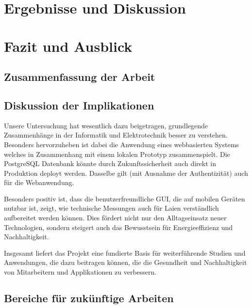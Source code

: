 \section{Ergebnisse und Diskussion}
\label{sec:ergebnisse_und_diskussion}



\section{Fazit und Ausblick}
\label{sec:fazit_und_ausblick}


\subsection{Zusammenfassung der Arbeit}



\subsection{Diskussion der Implikationen}

Unsere Untersuchung hat wesentlich dazu beigetragen, grundlegende Zusammenhänge in der Informatik und Elektrotechnik besser zu verstehen. Besonders hervorzuheben ist dabei die Anwendung eines webbasierten Systems welches in Zusammenhang mit einem lokalen Prototyp zusammenspielt. Die PostgreSQL Datenbank könnte durch Zukunftssicherheit auch direkt in Produktion deployt werden. Dasselbe gilt (mit Ausnahme der Authentizität) auch für die Webanwendung.

\vspace{1em}
\noindent Besonders positiv ist, dass die benutzerfreundliche GUI, die auf mobilen Geräten nutzbar ist, zeigt, wie technische Messungen auch für Laien verständlich aufbereitet werden können. Dies fördert nicht nur den Alltagseinsatz neuer Technologien, sondern steigert auch das Bewusstsein für Energieeffizienz und Nachhaltigkeit.

\vspace{1em}
\noindent Insgesamt liefert das Projekt eine fundierte Basis für weiterführende Studien und Anwendungen, die dazu beitragen können, die die Gesundheit und Nachhaltigkeit von Mitarbeitern und Applikationen zu verbessern.


\subsection{Bereiche für zukünftige Arbeiten}

